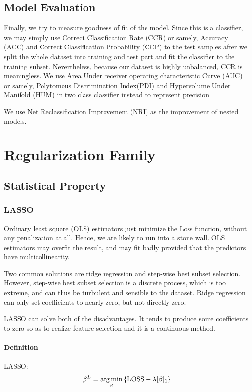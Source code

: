 \documentclass[]{article}
\begin{document}
\subsection{Model Evaluation}
Finally, we try to measure goodness of fit of the model. Since this is a classifier, we may simply use Correct Classification Rate (CCR) or samely, Accuracy (ACC) and Correct Classification Probability (CCP)\cite{li2012multicategory} to the test samples after we split the whole dataset into training and test part and fit the classifier to the training subset. Nevertheless, because our dataset is highly unbalanced, CCR is meaningless. We use Area Under receiver operating characteristic Curve (AUC)\cite{huang2005using} or samely, Polytomous Discrimination Index(PDI)\cite{van2012assessing} and Hypervolume Under Manifold (HUM)\cite{li2008roc} in two class classifier instead to represent precision.

We use Net Reclassification Improvement (NRI)\cite{pencina2011extensions} as the improvement of nested models.
\section{Regularization Family}
\subsection{Statistical Property}
\subsubsection{LASSO}
Ordinary least square (OLS) estimators just minimize the Loss function, without any penalization at all. Hence, we are likely to run into a stone wall. OLS estimators may overfit the result, and may fit badly provided that the predictors have multicollinearity.

Two common solutions are ridge regression and step-wise best subset selection. However, step-wise best subset selection is a discrete process, which is too extreme, and can thus be turbulent and sensible to the dataset. Ridge regression can only set coefficients to nearly zero, but not directly zero.

LASSO can solve both of the disadvantages. It tends to produce some coefficients to zero so as to realize feature selection and it is a continuous method.

\paragraph{Definition}
LASSO:
\begin{equation}
\beta^L =\mathop{\arg\min}_{\beta} \left\{\rm LOSS+\lambda|\beta|_1\right\}
\end{equation}
\end{document}

